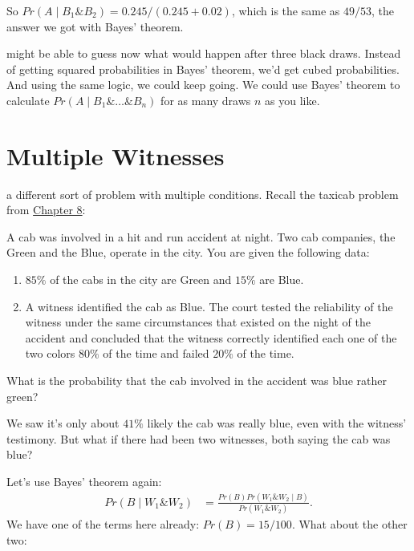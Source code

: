 \documentclass[justified]{tufte-book}
\providecommand{\tightlist}{%
  \setlength{\itemsep}{0pt}\setlength{\parskip}{0pt}}
\newcommand{\given}{\mid}
\renewcommand{\wedge}{\mathbin{\&}}
\newcommand{\p}{Pr}
\theoremstyle{definition}
\theoremstyle{definition}
\theoremstyle{definition}
\theoremstyle{remark}
\let\BeginKnitrBlock\begin \let\EndKnitrBlock\end
\begin{document}
So \(\p(A \given B_1 \wedge B_2) = 0.245 / (0.245 + 0.02)\), which is the same as \(49/53\), the answer we got with Bayes' theorem.

 might be able to guess now what would happen after three black draws. Instead of getting squared probabilities in Bayes' theorem, we'd get cubed probabilities. And using the same logic, we could keep going. We could use Bayes' theorem to calculate \(\p(A \given B_1 \wedge \ldots \wedge B_n)\) for as many draws \(n\) as you like.

\hypertarget{multiple-witnesses}{%
\section{Multiple Witnesses}\label{multiple-witnesses}}

 a different sort of problem with multiple conditions. Recall the taxicab problem from \protect\hyperlink{chbayes}{Chapter 8}:

\BeginKnitrBlock{problem}
A cab was involved in a hit and run accident at night. Two cab companies, the Green and the Blue, operate in the city. You are given the following data:

\begin{enumerate}
\def\labelenumi{\arabic{enumi}.}
\tightlist
\item
  \(85\%\) of the cabs in the city are Green and \(15\%\) are Blue.
\item
  A witness identified the cab as Blue. The court tested the reliability of the witness under the same circumstances that existed on the night of the accident and concluded that the witness correctly identified each one of the two colors \(80\%\) of the time and failed \(20\%\) of the time.
\end{enumerate}

What is the probability that the cab involved in the accident was blue rather green?
\EndKnitrBlock{problem}

We saw it's only about \(41\%\) likely the cab was really blue, even with the witness' testimony. But what if there had been two witnesses, both saying the cab was blue?

Let's use Bayes' theorem again:
\[
  \begin{aligned}
    \p(B \given W_1 \wedge W_2) &= \frac{\p(B)\p(W_1 \wedge W_2 \given B)}{\p(W_1 \wedge W_2)}.
  \end{aligned}
\]
We have one of the terms here already: \(\p(B) = 15/100\). What about the other two:
\end{document}
